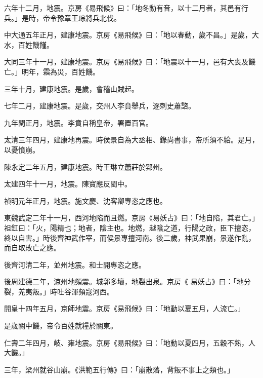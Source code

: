 \begin{pinyinscope}
 六年十二月，地震。京房《易飛候》曰：「地冬動有音，以十二月者，其邑有行兵。」是時，帝令豫章王琮將兵北伐。



 中大通五年正月，建康地震。京房《易飛候》曰：「地以春動，歲不昌。」是歲，大水，百姓饑饉。



 大同三年十一月，建康地震。京房《易飛候》曰：「地震以十一月，邑有大喪及饑亡。」明年，霜為災，百姓饑。



 三年十月，建康地震。是歲，會稽山賊起。



 七年二月，建康地震。是歲，交州人李賁舉兵，逐刺史蕭諮。



 九年閏正月，地震。李賁自稱皇帝，署置百官。



 太清三年四月，建康地再震。時侯景自為大丞相、錄尚書事，帝所須不給。是月，以憂憤崩。



 陳永定二年五月，建康地震。時王琳立蕭莊於郢州。



 太建四年十一月，地震。陳寶應反閩中。



 禎明元年正月，地震。施文慶、沈客卿專恣之應也。



 東魏武定二年十一月，西河地陷而且燃。京房《易妖占》曰：「地自陷，其君亡。」祖釭曰：「火，陽精也；地者，陰主也。地燃，越陰之道，行陽之政，臣下擅恣，終以自害。」時後齊神武作宰，而侯景專擅河南。後二歲，神武果崩，景遂作亂，而自取敗亡之應。



 後齊河清二年，並州地震。和士開專恣之應。



 後周建德二年，涼州地頻震。城郭多壞，地裂出泉。京房《
 易妖占》曰：「地分裂，羌夷叛。」時吐谷渾頻寇河西。



 開皇十四年五月，京師地震。京房《易飛候》曰：「地動以夏五月，人流亡。」



 是歲關中饑，帝令百姓就糧於關東。



 仁壽二年四月，岐、雍地震。京房《易飛候》曰：「地動以夏四月，五穀不熟，人大饑。」



 三年，梁州就谷山崩。《洪範五行傳》曰：「崩散落，背叛不事上之類也。」




\end{pinyinscope}
